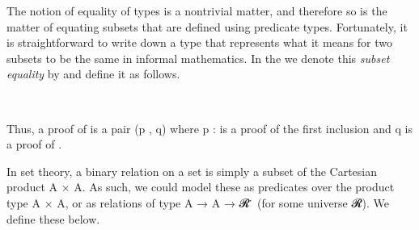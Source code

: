\documentclass[a4paper,UKenglish,cleveref,autoref,thm-restate,11pt]{lipics-v2021}
\begin{document}
\ccpad
The notion of equality of types is a nontrivial matter, and therefore so is the matter of equating subsets that are defined using predicate types.  Fortunately, it is straightforward to write down a type that represents what it means for two subsets to be the same in informal mathematics. In the \ualib we denote this \textit{subset equality} by \af{\(\doteq\)} and define it as follows.
\ccpad
\begin{code}%
\>[0]\AgdaOperator{\AgdaFunction{\AgdaUnderscore{}\(\doteq\)\AgdaUnderscore{}}}\AgdaSpace{}%
\AgdaSymbol{:}\AgdaSpace{}%
\AgdaSymbol{\{}\AgdaSpace{}%
\AgdaSymbol{:}\AgdaSpace{}%
%
\AgdaSpace{}%
\AgdaSymbol{\}}\AgdaSpace{}%
\AgdaSpace{}%
\AgdaSpace{}%
\AgdaSpace{}%
\AgdaSpace{}%
\AgdaSpace{}%
\AgdaSpace{}%
\AgdaSpace{}%
\AgdaSpace{}%
\AgdaSpace{}%
\AgdaSpace{}%
\AgdaSpace{}%
\AgdaSpace{}%
\AgdaSpace{}%
%
\<%
\\
\>[0]\AgdaSpace{}%
\AgdaOperator{\AgdaFunction{\(\doteq\)}}\AgdaSpace{}%
\AgdaSpace{}%
\AgdaSymbol{=}\AgdaSpace{}%
\AgdaSymbol{(}\AgdaSpace{}%
\AgdaSpace{}%
\AgdaSymbol{)}\AgdaSpace{}%
\AgdaSpace{}%
\AgdaSymbol{(}\AgdaSpace{}%
\AgdaSpace{}%
\AgdaSymbol{)}\<%
\end{code}
\ccpad
Thus, a proof of \AgdaSpace{}%
\AgdaOperator{\AgdaFunction{\(\doteq\)}}\AgdaSpace{}%
\AgdaSpace{}%
is a pair (\ab p , \ab q) where \ab p \as : \AgdaSpace{}%
\AgdaSpace{}%
 is a proof of the first inclusion and \ab q is a proof of \AgdaSpace{}%
\AgdaSpace{}%
.


In set theory, a binary relation on a set  is simply a subset of the Cartesian product \ab A × \ab A. As such, we could model these as predicates over the product type \ab A \af × \ab A, or as relations of type
\ab A \as → \ab A \as → \ab 𝓡 \af ̇  (for some universe \ab 𝓡). We define these below.
\end{document}

